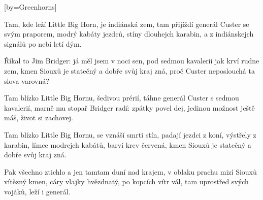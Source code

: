 [by={Greenhorns}]

\beginverse{}
Tam, kde leží Little Big Horn, je indiánská zem,
tam přijíždí generál Custer se svým praporem,
modrý kabáty jezdců, stíny dlouhejch karabin,
a z indiánskejch signálů po nebi letí dým.
\endverse{}

\beginchorus{}
Říkal to Jim Bridger: já měl jsem v noci sen,
pod sedmou kavalerií jak krví rudne zem,
kmen Siouxů je statečný a dobře svůj kraj zná,
proč Custer neposlouchá ta slova varovná?
\endchorus{}

\beginverse{}
Tam blízko Little Big Hornu, šedivou prérií,
táhne generál Custer s sedmou kavalerií,
marně mu stopař Bridger radí: zpátky povel dej,
jedinou možnost ještě máš, život si zachovej.
\endverse{}

\beginchorus{}

\endchorus{}

\beginverse{}
Tam blízko Little Big Hornu, se vznáší smrti stín,
padají jezdci z koní, výstřely z karabin,
límce modrejch kabátů, barví krev červená,
kmen Siouxů je statečný a dobře svůj kraj zná.
\endverse{}

\beginchorus{}

\endchorus{}

\beginverse{}
Pak všechno ztichlo a jen tamtam duní nad krajem,
v oblaku prachu mizí Siouxů vítězný kmen,
cáry vlajky hvězdnatý, po kopcích vítr vál,
tam uprostřed svých vojáků, leží i generál.
\endverse{}

\beginchorus{}

\endchorus{}

\endsong{}
